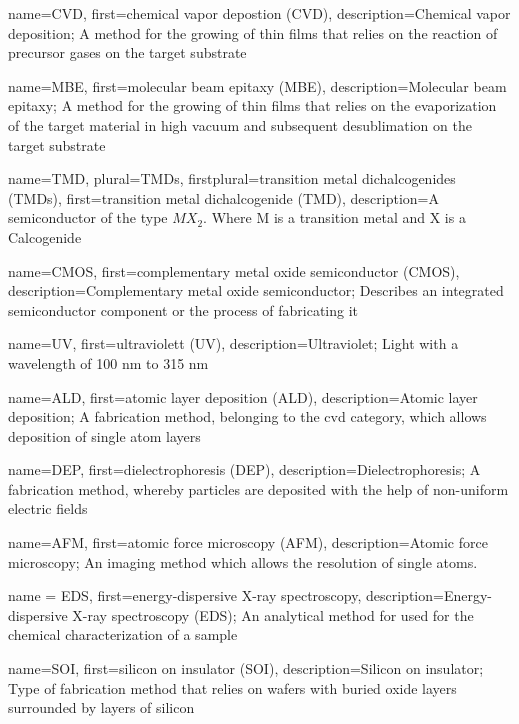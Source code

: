 {
    name={CVD},
    first={chemical vapor depostion (CVD)},
    description={Chemical vapor deposition; A method for the growing of thin films that relies on the reaction of precursor gases on the target substrate}
}

{
    name={MBE},
    first={molecular beam epitaxy (MBE)},
    description={Molecular beam epitaxy; A method for the growing of thin films that relies on the evaporization of the target material in high vacuum and subsequent desublimation on the target substrate}
}

{
    name={TMD},
    plural={TMDs},
    firstplural={transition metal dichalcogenides (TMDs)},
    first={transition metal dichalcogenide (TMD)},
    description={A semiconductor of the type $MX_{2}$. Where M is a transition metal and X is a Calcogenide}
}

{
    name={CMOS},
    first={complementary metal oxide semiconductor (CMOS)},
    description={Complementary metal oxide semiconductor; Describes an integrated semiconductor component or the process of fabricating it}
}

{
    name={UV},
    first={ultraviolett (UV)},
    description={Ultraviolet; Light with a wavelength of 100 nm to 315 nm}
}

{
    name={ALD},
    first={atomic layer deposition (ALD)},
    description={Atomic layer deposition; A fabrication method, belonging to the \gls{cvd} category, which allows deposition of single atom layers}
}

{
    name={DEP},
    first={dielectrophoresis (DEP)},
    description={Dielectrophoresis; A fabrication method, whereby particles are deposited with the help of non-uniform electric fields}
}

{
    name={AFM},
    first={atomic force microscopy (AFM)},
    description={Atomic force microscopy; An imaging method which allows the resolution of single atoms.}
}

{
    name = {EDS},
    first={energy-dispersive X-ray spectroscopy},
    description={Energy-dispersive X-ray spectroscopy (EDS); An analytical method for used for the chemical characterization of a sample}
}

{
    name={SOI},
    first={silicon on insulator (SOI)},
    description={Silicon on insulator; Type of fabrication method that relies on wafers with buried oxide layers surrounded by layers of silicon}
}

